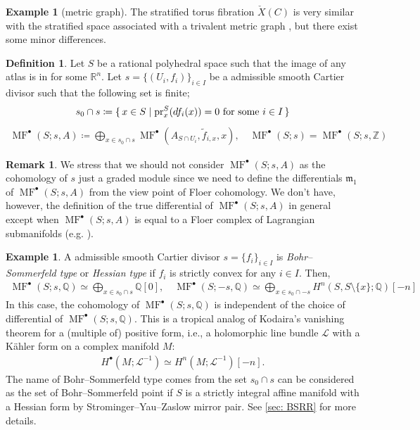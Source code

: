 \documentclass[a4paper,dvipdfmx,reqno,12pt]{amsart}
\theoremstyle{definition}
\newtheorem{Def}[Thm]{Definition}
\newtheorem{Eg}[Thm]{Example}
\newtheorem{Rmk}[Thm]{Remark}
\newcommand{\deq}{\coloneqq}
\newcommand{\R}{\mathbb{R}}%
\newcommand{\Q}{\mathbb{Q}}%
\newcommand{\Z}{\mathbb{Z}}%
\newcommand{\mcal}[1]{\mathcal{#1}}%
\newcommand{\mf}[1]{\mathfrak{#1}}%
\newcommand{\opn}[1]{\operatorname{#1}}
\numberwithin{equation}{section}
\begin{document}
\begin{Eg}[{metric graph}]
The stratified torus fibration $\check{X}(C)$ is very
similar with the stratified space associated
with a trivalent metric graph \cite{auroux2022lagrangian}, but
there exist some minor differences.
\end{Eg}

\begin{Def}
Let $S$ be a rational polyhedral space such that the image of
any atlas is in for some $\R^{n}$.
Let $s=\{(U_i,f_i)\}_{i\in I}$ be a admissible smooth Cartier divisor such that
the following set is finite;
\begin{align}
s_0 \cap s\deq \set{x\in S\mid \opn{pr}_x^{S}(df_i(x))=0 
\text{ for some } i\in I}
\end{align}
\begin{align}
\opn{MF}^{\bullet}(S;s,A)\deq 
\bigoplus_{x\in s_0 \cap s} 
\opn{MF}^{\bullet}(A_{S\cap U_i},\tilde{f}_{i,x},x), \quad
\opn{MF}^{\bullet}(S;s)=\opn{MF}^{\bullet}(S;s,\Z)
\end{align}
\end{Def}



\begin{Rmk} \label{rmk: cartier module}
We stress that we should not consider 
$\opn{MF}^{\bullet}(S;s,A)$ as the cohomology of $s$ just
a graded module 
since we need to define the differentials $\mf{m}_1$ of 
$\opn{MF}^{\bullet}(S;s,A)$ from the view point of 
Floer cohomology. We don't have, however,
the definition of the true differential of 
$\opn{MF}^{\bullet}(S;s,A)$ in general except when
$\opn{MF}^{\bullet}(S;s,A)$ is equal to a Floer complex
of Lagrangian submanifolds (e.g. \cite[5.2]{MR1882331}).
\end{Rmk}

\begin{Eg} \label{eg: kodaira}
A admissible smooth Cartier divisor $s=\{f_i\}_{i\in I}$ is 
\emph{Bohr--Sommerfeld type} or \emph{Hessian type} if
$f_i$ is strictly convex for any $i\in I$. Then,
\begin{align}
  \opn{MF}^{\bullet}(S;s,\Q)\simeq \bigoplus_{x\in s_0 \cap s} \Q[0], \quad
 \opn{MF}^{\bullet}(S;-s,\Q)\simeq \bigoplus_{x\in s_0\cap -s} 
H^{n}(S,S\setminus\{x\};\Q)[-n]
\end{align}
In this case, the cohomology of 
$\opn{MF}^{\bullet}(S;s,\Q)$ is independent of the choice of 
differential of $\opn{MF}^{\bullet}(S;s,\Q)$.
This is a tropical analog of Kodaira's vanishing theorem
for a (multiple of) positive form, i.e., a holomorphic line bundle $\mcal{L}$ with a 
K\"ahler form on a complex manifold $M$: 
\begin{align}
H^{\bullet}(M;\mcal{L}^{-1})\simeq H^{n}(M;\mcal{L}^{-1})[-n].
\end{align}
The name of Bohr--Sommerfeld type comes from 
the set $s_0\cap s$ can be considered as the set of 
Bohr--Sommerfeld point if $S$ is a strictly integral affine manifold 
with a Hessian form by Strominger--Yau--Zaslow mirror pair.
See \cref{sec: BSRR} for more details.
\end{Eg}
\end{document}
